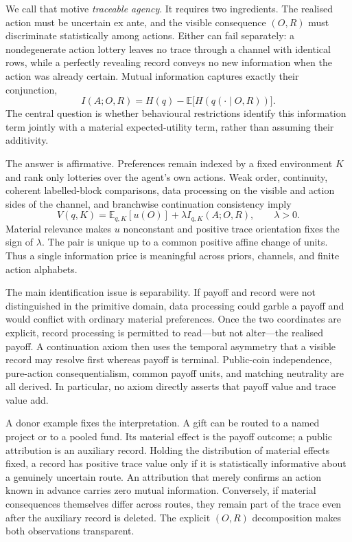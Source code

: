\documentclass[11pt,a4paper]{article}
\theoremstyle{definition}
\newcommand{\1}{\mathbf 1}
\begin{document}
We call that motive \emph{traceable agency}.  It requires two ingredients.  The realised action must be uncertain ex
ante, and the visible consequence $(O,R)$ must discriminate statistically among actions.  Either can fail separately:
a nondegenerate action lottery leaves no trace through a channel with identical rows, while a perfectly revealing
record conveys no new information when the action was already certain.  Mutual information captures exactly their
conjunction,
\[
 I(A;O,R)=H(q)-\mathbb E\bigl[H(q(\cdot\mid O,R))\bigr].
\]
The central question is whether behavioural restrictions identify this information term jointly with a material
expected-utility term, rather than assuming their additivity.

The answer is affirmative.  Preferences remain indexed by a fixed environment $K$ and rank only lotteries over the
agent's own actions.  Weak order, continuity, coherent labelled-block comparisons, data processing on the visible and
action sides of the channel, and branchwise continuation consistency imply
\[
 V(q,K)=\mathbb E_{q,K}[u(O)]+\lambda I_{q,K}(A;O,R),\qquad \lambda>0.
\]
Material relevance makes $u$ nonconstant and positive trace orientation fixes the sign of $\lambda$.  The pair is
unique up to a common positive affine change of units.  Thus a single information price is meaningful across priors,
channels, and finite action alphabets.

The main identification issue is separability.  If payoff and record were not distinguished in the primitive domain,
data processing could garble a payoff and would conflict with ordinary material preferences.  Once the two coordinates
are explicit, record processing is permitted to read---but not alter---the realised payoff.  A continuation axiom then
uses the temporal asymmetry that a visible record may resolve first whereas payoff is terminal.  Public-coin
independence, pure-action consequentialism, common payoff units, and matching neutrality are all derived.  In
particular, no axiom directly asserts that payoff value and trace value add.

A donor example fixes the interpretation.  A gift can be routed to a named project or to a pooled fund.  Its material
effect is the payoff outcome; a public attribution is an auxiliary record.  Holding the distribution of material
effects fixed, a record has positive trace value only if it is statistically informative about a genuinely uncertain
route.  An attribution that merely confirms an action known in advance carries zero mutual information.  Conversely,
if material consequences themselves differ across routes, they remain part of the trace even after the auxiliary
record is deleted.  The explicit $(O,R)$ decomposition makes both observations transparent.
\end{document}
